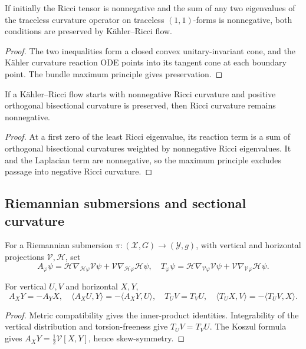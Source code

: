 \begin{example}
\label{ex:chow-ii-traceless-kahler-curvature-preserved}
If initially the Ricci tensor is nonnegative and the sum of any two
eigenvalues of the traceless curvature operator on traceless \((1,1)\)-forms
is nonnegative, both conditions are preserved by Kähler--Ricci flow.
\end{example}
\begin{proof}
The two inequalities form a closed convex unitary-invariant cone, and the
Kähler curvature reaction ODE points into its tangent cone at each boundary
point.  The bundle maximum principle gives preservation.
\end{proof}

\begin{example}
\label{ex:chow-ii-orthogonal-bisectional-preserves-ricci}
If a Kähler--Ricci flow starts with nonnegative Ricci curvature and positive
orthogonal bisectional curvature is preserved, then Ricci curvature remains
nonnegative.
\end{example}
\begin{proof}
At a first zero of the least Ricci eigenvalue, its reaction term is a sum of
orthogonal bisectional curvatures weighted by nonnegative Ricci eigenvalues.
It and the Laplacian term are nonnegative, so the maximum principle excludes
passage into negative Ricci curvature.
\end{proof}

\subsection{Riemannian submersions and sectional curvature}

For a Riemannian submersion \(\pi:(\mathcal X,G)\to(\mathcal Y,g)\), with
vertical and horizontal projections \(\mathcal V,\mathcal H\), set
\[
 A_\varphi\psi=\mathcal H\nabla_{\mathcal H\varphi}\mathcal V\psi
 +\mathcal V\nabla_{\mathcal H\varphi}\mathcal H\psi,
 \quad
 T_\varphi\psi=\mathcal H\nabla_{\mathcal V\varphi}\mathcal V\psi
 +\mathcal V\nabla_{\mathcal V\varphi}\mathcal H\psi.
\]

\begin{example}
\label{ex:chow-ii-oneill-tensor-symmetries}
For vertical \(U,V\) and horizontal \(X,Y\),
\[
 A_XY=-A_YX,\quad \langle A_XU,Y\rangle=-\langle A_XY,U\rangle,
\quad T_UV=T_VU,\quad
\langle T_UX,V\rangle=-\langle T_UV,X\rangle.
\]
\end{example}
\begin{proof}
Metric compatibility gives the inner-product identities.  Integrability of
the vertical distribution and torsion-freeness give \(T_UV=T_VU\).  The
Koszul formula gives \(A_XY=\tfrac12\mathcal V[X,Y]\), hence skew-symmetry.
\end{proof}

